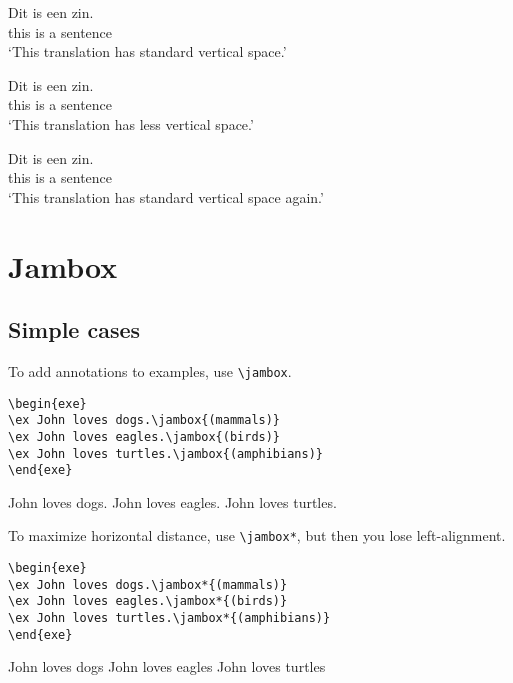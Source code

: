 \documentclass[output=paper]{langscibook}
\newcommand{\cmd}[1]{\texttt{\textbackslash#1}}
\begin{document}
\ea    
\gll Dit is een zin.\\ 
     this is a sentence\\
\glt `This translation has standard vertical space.'
\z

\nogltOffset

\ea 
\gll Dit is een zin.\\ 
     this is a sentence\\
\glt `This translation has less vertical space.'
\z

\resetgltOffset

\ea 
\gll Dit is een zin.\\ 
     this is a sentence\\
\glt `This translation has standard vertical space again.'
\z




\section{Jambox}
\subsection{Simple cases}
To add annotations to examples, use \cmd{jambox}.


\begin{lstlisting}
\begin{exe}
\ex John loves dogs.\jambox{(mammals)}
\ex John loves eagles.\jambox{(birds)}
\ex John loves turtles.\jambox{(amphibians)}   
\end{exe}
 \end{lstlisting}
 
\begin{exe}
\ex John loves dogs.
\ex John loves eagles.
\ex John loves turtles.   
\end{exe}  



To maximize horizontal distance, use \cmd{jambox*}, but then you lose left-alignment.

\begin{lstlisting} 
\begin{exe}
\ex John loves dogs.\jambox*{(mammals)}
\ex John loves eagles.\jambox*{(birds)}
\ex John loves turtles.\jambox*{(amphibians)}   
\end{exe}
 \end{lstlisting}
 
\begin{exe}
\settowidth{}
\ex John loves dogs
\ex John loves eagles
\ex John loves turtles   
\end{exe}  
\end{document}
